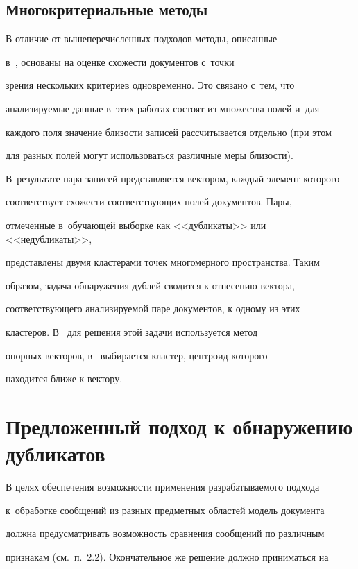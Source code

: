 \subsection{Многокритериальные методы}



  В отличие от вышеперечисленных подходов методы, описанные

  в~\cite{12-sim, 15-sim}, основаны на оценке схожести документов с~точки

зрения нескольких критериев одновременно. Это связано с~тем, что

анализируемые данные в~этих работах состоят из множества полей и~для

каждого поля значение близости записей рассчитывается отдельно (при этом

для разных полей могут использоваться различные меры близости).

В~результате пара записей представляется вектором, каждый элемент которого

соответствует схожести соответствующих полей документов. Пары,

отмеченные в~обучающей выборке как <<дубликаты>> или <<недубликаты>>,

представлены двумя кластерами точек многомерного пространства. Таким

образом, задача обнаружения дублей сводится к отнесению вектора,

соответствующего анализируемой паре документов, к одному из этих

кластеров. В~\cite{12-sim} для решения этой задачи используется метод

опорных векторов, в~\cite{15-sim} выбирается кластер, центроид которого

находится ближе к вектору.



\section{Предложенный подход к обнаружению дубликатов}



  В целях обеспечения возможности применения разрабатываемого подхода

  к~обработке сообщений из разных предметных областей модель документа

должна предусматривать возможность сравнения сообщений по различным

признакам (см.\ п.~2.2). Окончательное же решение должно приниматься на


